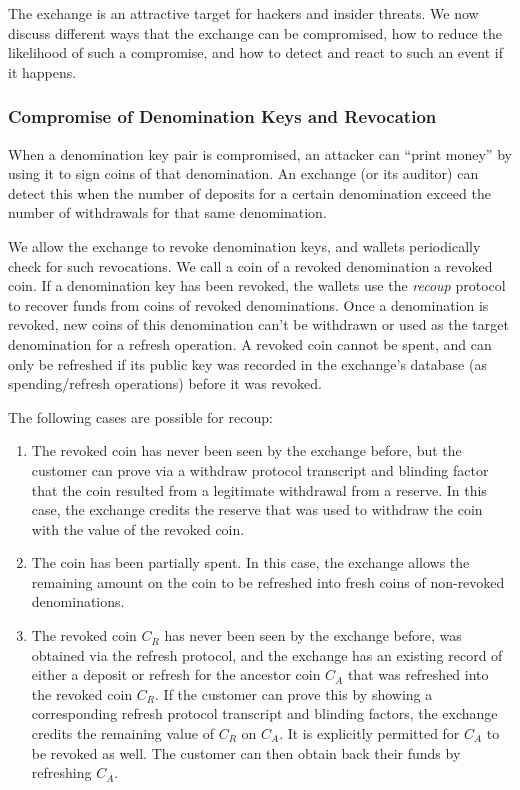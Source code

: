 The exchange is an attractive target for hackers and insider threats.  We now
discuss different ways that the exchange can be compromised, how to reduce the
likelihood of such a compromise, and how to detect and react to such an event
if it happens.

\subsubsection{Compromise of Denomination Keys and Revocation}\label{sec:revocation-recoup}

When a denomination key pair is compromised, an attacker can ``print money'' by
using it to sign coins of that denomination.  An exchange (or its auditor) can
detect this when the number of deposits for a certain denomination exceed the
number of withdrawals for that same denomination.

We allow the exchange to revoke denomination keys, and wallets periodically
check for such revocations.  We call a coin of a revoked denomination a revoked
coin.  If a denomination key has been revoked, the wallets use the
\emph{recoup} protocol to recover funds from coins of revoked denominations.
Once a denomination is revoked, new coins of this denomination can't be
withdrawn or used as the target denomination for a refresh operation. A revoked
coin cannot be spent, and can only be refreshed if its public key was recorded
in the exchange's database (as spending/refresh operations) before it was
revoked.

The following cases are possible for recoup:
\begin{enumerate}
  \item The revoked coin has never been seen by the exchange before, but the
    customer can prove via a withdraw protocol transcript and blinding factor
    that the coin resulted from a legitimate withdrawal from a reserve.  In
    this case, the exchange credits the reserve that was used to withdraw the
    coin with the value of the revoked coin.
  \item The coin has been partially spent.  In this case, the exchange allows
    the remaining amount on the coin to be refreshed into fresh coins of
    non-revoked denominations.
  \item The revoked coin $C_R$ has never been seen by the exchange before, was
    obtained via the refresh protocol, and the exchange has an existing record
    of either a deposit or refresh for the ancestor coin $C_A$ that was
    refreshed into the revoked coin $C_R$. If the customer can prove this by
    showing a corresponding refresh protocol transcript and blinding factors, the exchange credits
    the remaining value of $C_R$ on $C_A$.  It is explicitly permitted for $C_A$
    to be revoked as well.  The customer can then obtain back their funds by
    refreshing $C_A$.
\end{enumerate}

